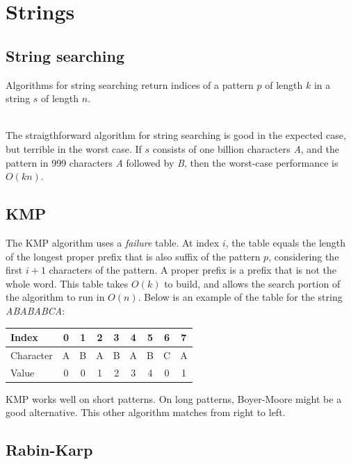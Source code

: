 \documentclass[a4paper, 12pt]{article}
\begin{document}
\section{Strings}

  \subsection{String searching}

Algorithms for string searching return indices of a pattern $p$ of length $k$ in a string $s$ of length $n$.

~\\
The straigthforward algorithm for string searching is good in the expected case, but terrible in the worst case. If $s$ consists of one billion characters \textit{A}, and the pattern in 999 characters \textit{A} followed by \textit{B}, then the worst-case performance is $O(kn)$.

  \subsection{KMP}

The KMP algorithm uses a \textit{failure} table. At index $i$, the table equals the length of the longest proper prefix that is also suffix of the pattern $p$, considering the first $i+1$ characters of the pattern. A proper prefix is a prefix that is not the whole word. This table takes $O(k)$ to build, and allows the search portion of the algorithm to run in $O(n)$. Below is an example of the table for the string \textit{ABABABCA}:

\begin{center}
  \begin{tabular}{| l | c | c | c | c | c | c | c | c |}
    \hline
    Index & 0 & 1 & 2 & 3 & 4 & 5 & 6 & 7 \\ \hline
    Character & A & B & A & B & A & B & C & A \\ \hline
    Value & 0 & 0 & 1 & 2 & 3 & 4 & 0 & 1 \\ \hline
  \end{tabular}
\end{center}

KMP works well on short patterns. On long patterns, Boyer-Moore might be a good alternative. This other algorithm matches from right to left.

  \subsection{Rabin-Karp}
\end{document}
